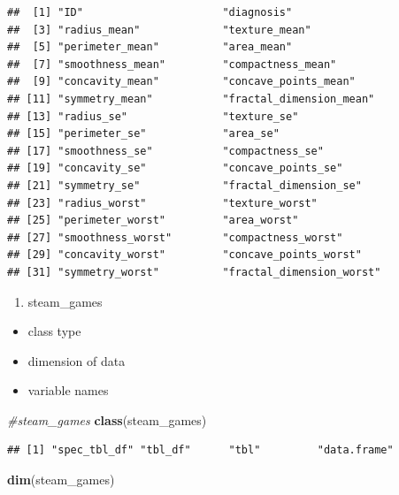 \documentclass[
]{article}
\newenvironment{Shaded}{\begin{snugshade}}{\end{snugshade}}
\newcommand{\CommentTok}[1]{\textcolor[rgb]{0.56,0.35,0.01}{\textit{#1}}}
\newcommand{\KeywordTok}[1]{\textcolor[rgb]{0.13,0.29,0.53}{\textbf{#1}}}
\newcommand{\NormalTok}[1]{#1}
\providecommand{\tightlist}{%
  \setlength{\itemsep}{0pt}\setlength{\parskip}{0pt}}
\begin{document}
\begin{verbatim}
##  [1] "ID"                      "diagnosis"              
##  [3] "radius_mean"             "texture_mean"           
##  [5] "perimeter_mean"          "area_mean"              
##  [7] "smoothness_mean"         "compactness_mean"       
##  [9] "concavity_mean"          "concave_points_mean"    
## [11] "symmetry_mean"           "fractal_dimension_mean" 
## [13] "radius_se"               "texture_se"             
## [15] "perimeter_se"            "area_se"                
## [17] "smoothness_se"           "compactness_se"         
## [19] "concavity_se"            "concave_points_se"      
## [21] "symmetry_se"             "fractal_dimension_se"   
## [23] "radius_worst"            "texture_worst"          
## [25] "perimeter_worst"         "area_worst"             
## [27] "smoothness_worst"        "compactness_worst"      
## [29] "concavity_worst"         "concave_points_worst"   
## [31] "symmetry_worst"          "fractal_dimension_worst"
\end{verbatim}

\begin{enumerate}
\def\labelenumi{\arabic{enumi}.}
\setcounter{enumi}{2}
\tightlist
\item
  steam\_games
\end{enumerate}

\begin{itemize}
\tightlist
\item
  class type
\item
  dimension of data
\item
  variable names
\end{itemize}

\begin{Shaded}
\begin{Highlighting}[]
\CommentTok{\#steam\_games}
\KeywordTok{class}\NormalTok{(steam\_games)}
\end{Highlighting}
\end{Shaded}

\begin{verbatim}
## [1] "spec_tbl_df" "tbl_df"      "tbl"         "data.frame"
\end{verbatim}

\begin{Shaded}
\begin{Highlighting}[]
\KeywordTok{dim}\NormalTok{(steam\_games)}
\end{Highlighting}
\end{Shaded}
\end{document}
